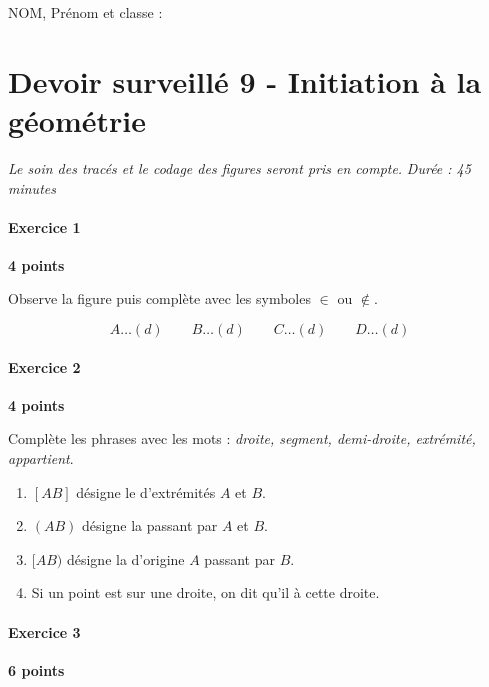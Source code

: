 \documentclass[a4paper,10pt]{report}
\begin{document}
\pagestyle{empty}
\noindent NOM, Prénom et classe : \dotfill

\section*{Devoir surveillé 9 - Initiation à la géométrie}
\noindent\textit{Le soin des tracés et le codage des figures seront pris en compte.} \hfill \textit{Durée : 45 minutes}

\medskip
\paragraph{Exercice 1} \hfill \textbf{4 points}

\noindent Observe la figure puis complète avec les symboles $\in$ ou $\notin$.

\begin{center}
\end{center}

\[
A \dots (d) \qquad B \dots (d) \qquad C \dots (d) \qquad D \dots (d)
\]

\medskip
\paragraph{Exercice 2} \hfill \textbf{4 points}

\noindent Complète les phrases avec les mots : \textit{droite, segment, demi-droite, extrémité, appartient}.
\begin{enumerate}
\item $[AB]$ désigne le \dotfill d'extrémités $A$ et $B$.
\item $(AB)$ désigne la \dotfill passant par $A$ et $B$.
\item $[AB)$ désigne la \dotfill d'origine $A$ passant par $B$.
\item Si un point est sur une droite, on dit qu'il \dotfill à cette droite.
\end{enumerate}

\medskip
\paragraph{Exercice 3} \hfill \textbf{6 points}
\end{document}
